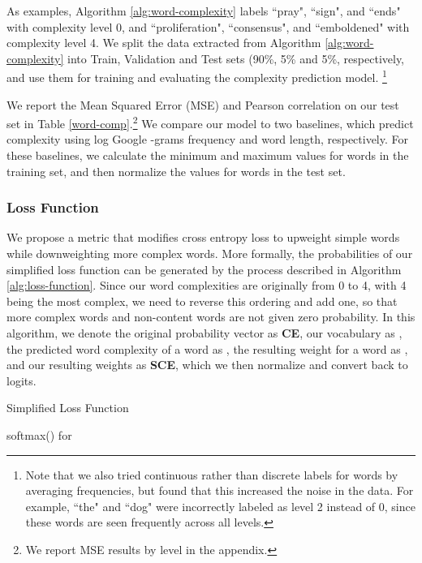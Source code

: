 \documentclass[11pt,a4paper]{article}
\begin{document}
As examples, Algorithm \ref{alg:word-complexity} labels ``pray", ``sign", and ``ends" with complexity level 0, and ``proliferation", ``consensus", and ``emboldened" with complexity level 4. We split the data extracted from Algorithm \ref{alg:word-complexity} into Train, Validation and Test sets (90\%, 5\% and 5\%, respectively, and use them for training and evaluating the complexity prediction model. \footnote{Note that we also tried continuous rather than discrete labels for words by averaging frequencies, but found that this increased the noise in the data. For example, ``the" and ``dog" were incorrectly labeled as level 2 instead of 0, since these words are seen frequently across all levels.}

We report the Mean Squared Error (MSE) and Pearson correlation on our test set in Table \ref{word-comp}.\footnote{We report MSE results by level in the appendix.} We compare our model to two baselines, which predict complexity using log Google -grams frequency \cite{thorsten2006web} and word length, respectively. For these baselines, we calculate the minimum and maximum values for words in the training set, and then normalize the values for words in the test set.

\subsubsection{Loss Function}

We propose a metric that modifies cross entropy loss to upweight simple words while downweighting more complex words. More formally, the probabilities of our simplified loss function can be generated by the process described in Algorithm \ref{alg:loss-function}. Since our word complexities are originally from 0 to 4, with 4 being the most complex, we need to reverse this ordering and add one, so that more complex words and non-content words are not given zero probability. In this algorithm, we denote the original probability vector as \textbf{CE}, our vocabulary as , the predicted word complexity of a word  as , the resulting weight for a word as , and our resulting weights as \textbf{SCE}, which we then normalize and convert back to logits.

\begin{algorithm}
\caption{Simplified Loss Function}
\label{alg:loss-function}

\begin{algorithmic}[1]
\State  softmax()
\For{}
    \State 
        \State 
    \Else
        \State 
    \EndIf
\EndFor
\State  for 
\State 

\Return 
\EndProcedure
\end{algorithmic}
\end{algorithm}
\end{document}
